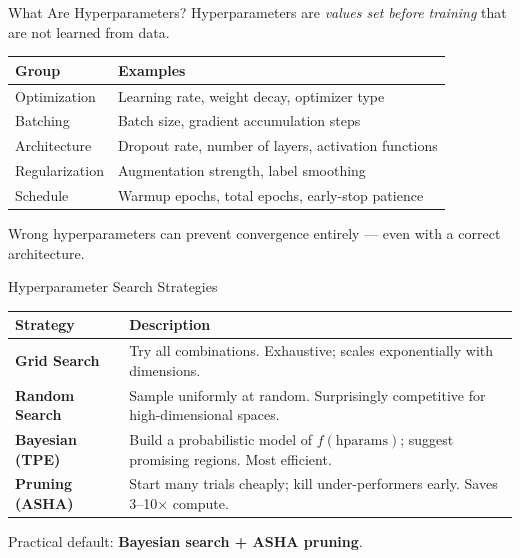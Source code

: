 \documentclass[aspectratio=169]{beamer}
\begin{document}
\begin{frame}[t]{What Are Hyperparameters?}
Hyperparameters are \textit{values set before training} that are not learned from data.

\vspace{2mm}
\begin{tabular}{@{}p{3.0cm}p{8.2cm}@{}}
\toprule
Group & Examples \\
\midrule
Optimization  & Learning rate, weight decay, optimizer type \\
Batching      & Batch size, gradient accumulation steps \\
Architecture  & Dropout rate, number of layers, activation functions \\
Regularization & Augmentation strength, label smoothing \\
Schedule      & Warmup epochs, total epochs, early-stop patience \\
\bottomrule
\end{tabular}

Wrong hyperparameters can prevent convergence entirely --- even with a correct architecture.
\end{frame}

\begin{frame}[t]{Hyperparameter Search Strategies}
\begin{tabular}{@{}p{2.8cm}p{8.5cm}@{}}
\toprule
Strategy & Description \\
\midrule
\textbf{Grid Search}   & Try all combinations. Exhaustive; scales exponentially with dimensions. \\
\textbf{Random Search} & Sample uniformly at random. Surprisingly competitive for high-dimensional spaces. \\
\textbf{Bayesian (TPE)} & Build a probabilistic model of $f(\text{hparams})$; suggest promising regions. Most efficient. \\
\textbf{Pruning (ASHA)} & Start many trials cheaply; kill under-performers early. Saves 3--10$\times$ compute. \\
\bottomrule
\end{tabular}

Practical default: \textbf{Bayesian search + ASHA pruning}.
\end{frame}
\end{document}
